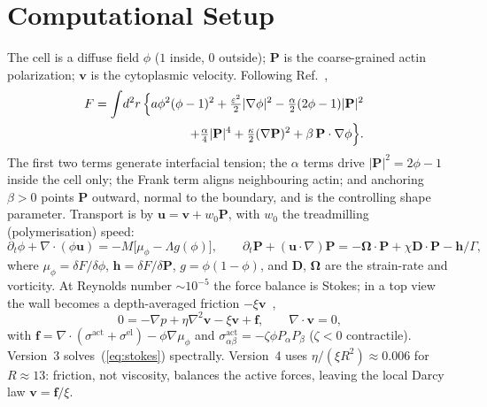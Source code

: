\documentclass[11pt]{article}
\begin{document}
\section{Computational Setup}
\label{sec:model}

\noindent
The cell is a diffuse field $\phi$ ($1$ inside, $0$ outside);
$\mathbf{P}$ is the coarse-grained actin polarization; $\mathbf{v}$ is the
cytoplasmic velocity. Following Ref.~\cite{Tjhung:2015},
\begin{eqnarray}\label{eq:F}
F=\int\!d^2r\,\Bigl\{
a\phi^{2}(\phi-1)^{2}
+\tfrac{\varepsilon^{2}}{2}|\nabla\phi|^{2}
-\tfrac{\alpha}{2}(2\phi-1)|\mathbf{P}|^{2}
&&\nonumber\\
+\tfrac{\alpha}{4}|\mathbf{P}|^{4}
+\tfrac{\kappa}{2}(\nabla\mathbf{P})^{2}
+\beta\,\mathbf{P}\cdot\nabla\phi\Bigr\}.
\end{eqnarray}
The first two terms generate interfacial tension; the $\alpha$ terms drive
$|\mathbf{P}|^{2}=2\phi-1$ inside the cell only; the Frank term aligns
neighbouring actin; and anchoring $\beta>0$ points $\mathbf{P}$ outward,
normal to the boundary, and is the controlling shape parameter. Transport
is by $\mathbf{u}=\mathbf{v}+w_{0}\mathbf{P}$, with $w_{0}$ the treadmilling
(polymerisation) speed:
\begin{equation}\label{eq:eom}
\partial_t\phi+\nabla\cdot(\phi\mathbf{u})
=-M\bigl[\mu_\phi-\Lambda g(\phi)\bigr],\qquad
\partial_t\mathbf{P}+(\mathbf{u}\cdot\nabla)\mathbf{P}
=-\boldsymbol{\Omega}\cdot\mathbf{P}+\chi\mathbf{D}\cdot\mathbf{P}
-\mathbf{h}/\Gamma,
\end{equation}
where $\mu_\phi=\delta F/\delta\phi$, $\mathbf{h}=\delta F/\delta\mathbf{P}$,
$g=\phi(1-\phi)$, and $\mathbf{D}$, $\boldsymbol{\Omega}$ are the strain-rate
and vorticity. At Reynolds number $\sim10^{-5}$ the force balance is
Stokes; in a top view the wall becomes a depth-averaged friction
$-\xi\mathbf{v}$~\cite{Leoni:2017},
\begin{equation}\label{eq:stokes}
0=-\nabla p+\eta\nabla^{2}\mathbf{v}-\xi\mathbf{v}+\mathbf{f},\qquad
\nabla\cdot\mathbf{v}=0,
\end{equation}
with $\mathbf{f}=\nabla\cdot(\sigma^{\mathrm{act}}+\sigma^{\mathrm{el}})
-\phi\nabla\mu_\phi$ and
$\sigma^{\mathrm{act}}_{\alpha\beta}=-\zeta\phi P_\alpha P_\beta$
($\zeta<0$ contractile). Version~3 solves~(\ref{eq:stokes}) spectrally.
Version~4 uses $\eta/(\xi R^{2})\approx0.006$ for $R\approx13$: friction, not
viscosity, balances the active forces, leaving the local Darcy law
$\mathbf{v}=\mathbf{f}/\xi$.
\end{document}
